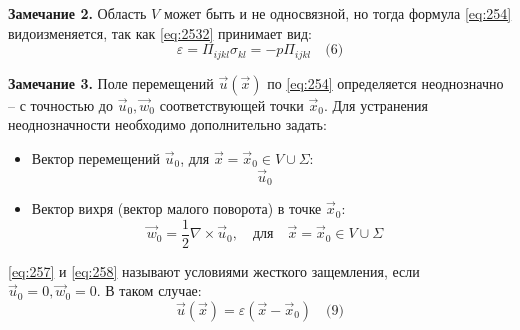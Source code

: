 \textbf{Замечание 2.} Область \( V \) может быть и не односвязной, но тогда формула \ref{eq:254}  видоизменяется, так как \ref{eq:2532} принимает вид:
\begin{equation}
\varepsilon = \Pi_{ijkl} \sigma_{kl} = - p \Pi_{ijkl} \quad \text{(6)}
\end{equation}

\textbf{Замечание 3.} Поле перемещений \( \vec{u}(\vec{x}) \) по \ref{eq:254} определяется неоднозначно – с точностью до \( \vec{u}_0, \vec{w}_0 \) соответствующей точки \( \vec{x}_0 \). Для устранения неоднозначности необходимо дополнительно задать:
\begin{itemize}
    \item Вектор перемещений \( \vec{u}_0 \), для \( \vec{x} = \vec{x}_0 \in V \cup \Sigma \):
    \begin{equation}
    \vec{u}_0 \quad \label{eq:257}
    \end{equation}
    \item Вектор вихря (вектор малого поворота) в точке \( \vec{x}_0 \):
    \begin{equation}
    \vec{w}_0 = \frac{1}{2} \nabla \times \vec{u}_0, \quad \text{для} \quad \vec{x} = \vec{x}_0 \in V \cup \Sigma \quad \label{eq:258}
    \end{equation}
\end{itemize}
\ref{eq:257} и \ref{eq:258} называют условиями жесткого защемления, если \( \vec{u}_0 = 0, \vec{w}_0 = 0 \). В таком случае:
\begin{equation}
\vec{u}(\vec{x}) = \varepsilon (\vec{x} - \vec{x}_0) \quad \text{(9)}
\end{equation}
